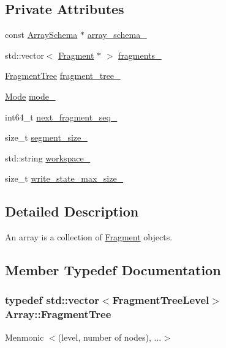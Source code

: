 \subsection*{Private Attributes}
\begin{DoxyCompactItemize}
\item 
const \hyperlink{classArraySchema}{Array\+Schema} $\ast$ \hyperlink{classArray_a5499e3946904ceb3c1f9dbeba54e23aa}{array\+\_\+schema\+\_\+}
\item 
std\+::vector$<$ \hyperlink{classFragment}{Fragment} $\ast$ $>$ \hyperlink{classArray_a1affe7c22be3ad39bc8636840d8cc148}{fragments\+\_\+}
\item 
\hyperlink{classArray_a7bbd1306e58f5cb6f6e633c121df05b8}{Fragment\+Tree} \hyperlink{classArray_ae2c7e4b3dd4543b83398eb59be937fb8}{fragment\+\_\+tree\+\_\+}
\item 
\hyperlink{classArray_af5ea7849b92677a1f529cdb76b501920}{Mode} \hyperlink{classArray_aef623a8cbd136892ffa321404513855b}{mode\+\_\+}
\item 
int64\+\_\+t \hyperlink{classArray_a7872787919cfff80a1205372c9ec440c}{next\+\_\+fragment\+\_\+seq\+\_\+}
\item 
size\+\_\+t \hyperlink{classArray_aebadf41b4ba237440d26a448a6092bd4}{segment\+\_\+size\+\_\+}
\item 
std\+::string \hyperlink{classArray_acb0d651fc80fd7a93a1aafdaa62c87c2}{workspace\+\_\+}
\item 
size\+\_\+t \hyperlink{classArray_a09b22ce501ae511eaee253066a3ea1e3}{write\+\_\+state\+\_\+max\+\_\+size\+\_\+}
\end{DoxyCompactItemize}


\subsection{Detailed Description}
An array is a collection of \hyperlink{classFragment}{Fragment} objects. 

\subsection{Member Typedef Documentation}
\hypertarget{classArray_a7bbd1306e58f5cb6f6e633c121df05b8}{}
\subsubsection[{Fragment\+Tree}]{\setlength{\rightskip}{0pt plus 5cm}typedef std\+::vector$<${\bf Fragment\+Tree\+Level}$>$ {\bf Array\+::\+Fragment\+Tree}}\label{classArray_a7bbd1306e58f5cb6f6e633c121df05b8}
Menmonic $<$(level, number of nodes), ...$>$ \hypertarget{classArray_a4ee28ba68259060587f520d625065c19}{}
